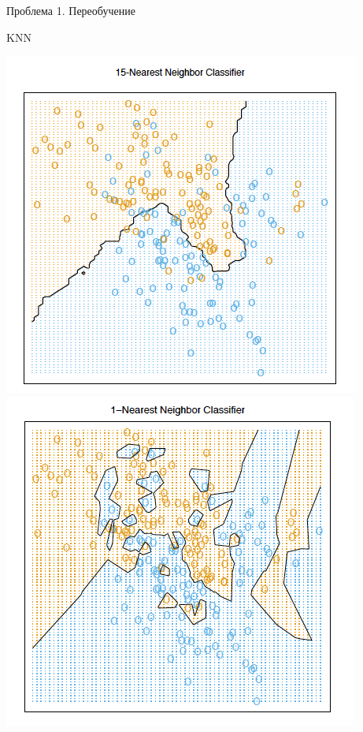 \documentclass[aspectratio=169]{beamer}
\begin{document}
\begin{frame}{Проблема 1. Переобучение}

KNN

\begin{center}
\includegraphics[scale=0.3]{images/knn_cls.png}
\includegraphics[scale=0.3]{images/knn_cls_1.png}

\end{center}
\end{frame}
\end{document}
